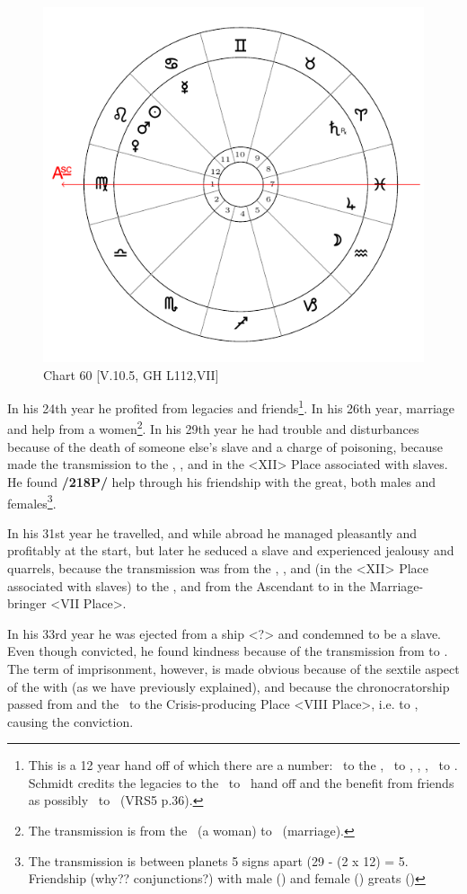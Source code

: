 \begin{figure}
\centering
\vspace{-20pt}
\includegraphics[width=.68\textwidth]{charts/5_10_05}
\caption{Chart 60 [V.10.5, GH L112,VII]}
\label{fig:chart60}
\end{figure}


In his 24th year he profited from legacies and friends\footnote{This is a 12 year hand off of which there are a number: \Jupiter\, to the \Moon, \Saturn\, to \Jupiter,  \Venus, \Mars, \Sun\, to \Mercury. Schmidt credits the legacies to the \Saturn\, to \Jupiter\, hand off and the benefit from friends as possibly \Venus\, to \Mercury\, (VRS5 p.36).}. In his 26th year, marriage and help from a women\footnote{The transmission is from the \Moon\, (a woman) to \Jupiter\, (marriage).}. In his 29th year he had trouble and disturbances because of the death of someone else’s slave and a charge of poisoning, because \Saturn\xspace made the transmission to the \Sun, \Mars, and \Venus\xspace in the <XII> Place associated with slaves. He found \textbf{/218P/} help through his friendship with the great, both males and females\footnote{The transmission is between planets 5 signs apart (29 - (2 x 12) = 5. Friendship (why?? conjunctions?) with male (\Mars) and female (\Venus) greats (\Sun)}. 

In his 31st year he travelled, and while abroad he managed pleasantly and profitably at the start, but later he seduced a slave and experienced jealousy and quarrels, because the transmission was from the \Sun, \Venus, and \Mars (in the <XII> Place associated with slaves) to the \Moon, and from the Ascendant to \Jupiter\xspace in the Marriage-bringer <VII Place>. 

In his 33rd year he was ejected from a ship <?> and condemned to be a slave. Even though convicted, he found kindness because
of the transmission from \Mercury\xspace to \Jupiter. The term of imprisonment, however, is made obvious because of the sextile aspect of the \Moon\xspace with \Saturn\xspace (as we have previously explained), and because the chronocratorship passed from \Mars\xspace and the \Sun\, to the Crisis-producing Place <VIII Place>, i.e. to \Saturn, causing the conviction. 

